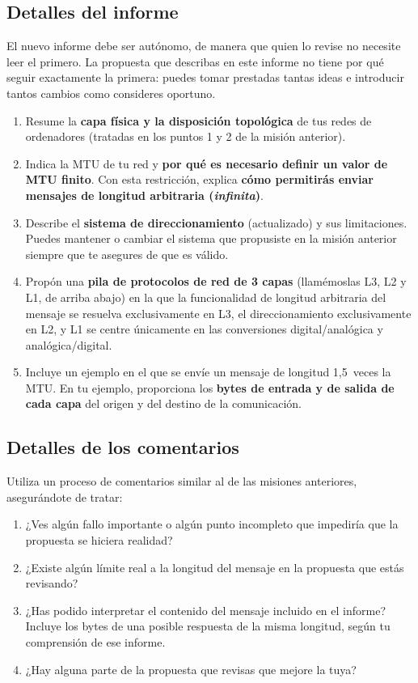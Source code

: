\subsection*{Detalles del informe}
El nuevo informe debe ser autónomo, de manera que quien lo revise no necesite leer el primero.
La propuesta que describas en este informe no tiene por qué seguir exactamente la primera: puedes tomar prestadas tantas ideas e introducir tantos cambios como consideres oportuno.
%
\begin{enumerate}[itemsep=0.1cm]
\item Resume la \textbf{capa física y la disposición topológica} de tus redes de ordenadores (tratadas en los puntos 1 y 2 de la misión anterior).

\item Indica la MTU de tu red y \textbf{por qué es necesario definir un valor de MTU finito}. Con esta restricción, explica \textbf{cómo permitirás enviar mensajes de longitud arbitraria (\textit{infinita})}.

\item Describe el \textbf{sistema de direccionamiento} (actualizado) y sus limitaciones. Puedes mantener o cambiar el sistema que propusiste en la misión anterior siempre que te asegures de que es válido.

\item Propón una \textbf{pila de protocolos de red de 3 capas} (llamémoslas L3, L2 y L1, de arriba abajo) en la que la funcionalidad de longitud arbitraria del mensaje se resuelva exclusivamente en L3, el direccionamiento exclusivamente en L2, y L1 se centre únicamente en las conversiones digital/analógica y analógica/digital.

\item Incluye un ejemplo en el que se envíe un mensaje de longitud 1,5~veces la MTU. En tu ejemplo, proporciona los \textbf{bytes de entrada y de salida de cada capa} del origen y del destino de la comunicación.
\end{enumerate}

\subsection*{Detalles de los comentarios}

Utiliza un proceso de comentarios similar al de las misiones anteriores, asegurándote de tratar:
\begin{enumerate}[itemsep=0.1cm]
\item ¿Ves algún fallo importante o algún punto incompleto que impediría que la propuesta se hiciera realidad?
\item ¿Existe algún límite real a la longitud del mensaje en la propuesta que estás revisando?
\item ¿Has podido interpretar el contenido del mensaje incluido en el informe? Incluye los bytes de una posible respuesta de la misma longitud, según tu comprensión de ese informe.
\item ¿Hay alguna parte de la propuesta que revisas que mejore la tuya?
\end{enumerate}

